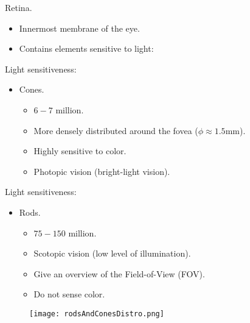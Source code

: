 
\begin{frame}
Retina.
\begin{itemize}
\item Innermost membrane of the eye.
\item Contains elements sensitive to light:
\end{itemize}
Light sensitiveness:
\begin{itemize}
\item Cones.
\begin{itemize}
\item $6-7$ million.
\item More densely distributed around the fovea ($\phi\approx 1.5$mm).
\item Highly sensitive to color.
\item Photopic vision (bright-light vision).
\end{itemize}
\end{itemize}
\end{frame}


\begin{frame}
Light sensitiveness:
\begin{itemize}
\item Rods.
\begin{itemize}
\item $75-150$ million.
\item Scotopic vision (low level of illumination).
\item Give an overview of the Field-of-View (FOV).
\item Do not sense color.
\end{itemize}
\end{itemize}
\begin{figure}
\texttt{[image: rodsAndConesDistro.png]}
\end{figure}
\end{frame}


